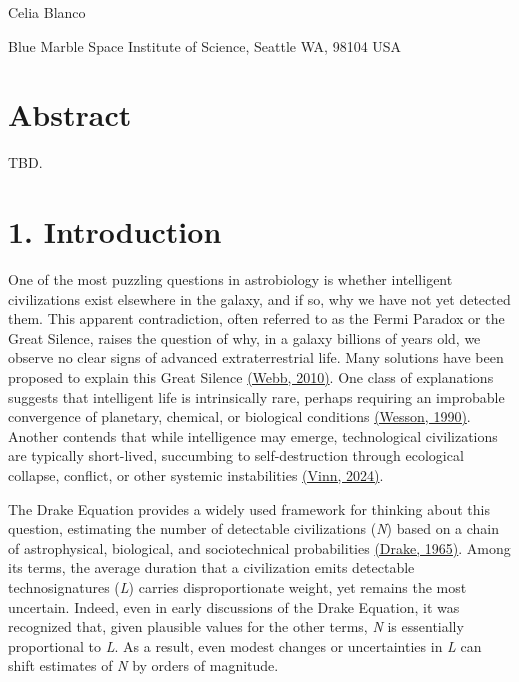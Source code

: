 Celia Blanco

Blue Marble Space Institute of Science, Seattle WA, 98104 USA

\section{Abstract}\label{abstract}

TBD.

\section{1. Introduction}\label{introduction}

One of the most puzzling questions in astrobiology is whether intelligent civilizations exist elsewhere in the galaxy, and if so, why we have not yet detected them. This apparent contradiction, often referred to as the Fermi Paradox or the Great Silence, raises the question of why, in a galaxy billions of years old, we observe no clear signs of advanced extraterrestrial life. Many solutions have been proposed to explain this Great Silence \href{https://paperpile.com/c/hQuIW4/fyLf}{(Webb, 2010)}. One class of explanations suggests that intelligent life is intrinsically rare, perhaps requiring an improbable convergence of planetary, chemical, or biological conditions \href{https://paperpile.com/c/hQuIW4/xYaq}{(Wesson, 1990)}. Another contends that while intelligence may emerge, technological civilizations are typically short-lived, succumbing to self-destruction through ecological collapse, conflict, or other systemic instabilities \href{https://paperpile.com/c/hQuIW4/5aSj}{(Vinn, 2024)}.

The Drake Equation provides a widely used framework for thinking about this question, estimating the number of detectable civilizations (\emph{N}) based on a chain of astrophysical, biological, and sociotechnical probabilities \href{https://paperpile.com/c/hQuIW4/Ed2x}{(Drake, 1965)}. Among its terms, the average duration that a civilization emits detectable technosignatures (\emph{L}) carries disproportionate weight, yet remains the most uncertain. Indeed, even in early discussions of the Drake Equation, it was recognized that, given plausible values for the other terms, \emph{N} is essentially proportional to \emph{L}. As a result, even modest changes or uncertainties in \emph{L} can shift estimates of \emph{N} by orders of magnitude.

